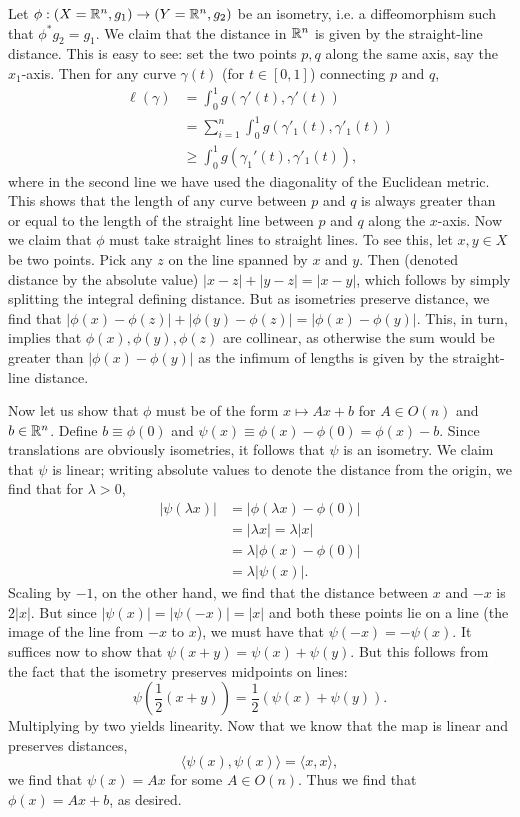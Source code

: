 \documentclass{../mathnotes}
\begin{document}
Let $\phi:(X=\mathbb{R}^n,g_1)\to(Y=\mathbb{R}^n,g_2)$ be an isometry, i.e. a diffeomorphism such that $\phi^*g_2=g_1$.
We claim that the distance in $\mathbb{R}^n$ is given by the straight-line distance. This is easy to see: set the two
points $p,q$ along the same axis, say the $x_1$-axis. Then for any curve $\gamma(t)$ (for $t\in[0,1]$) connecting
$p$ and $q$,
\begin{align*}
    \ell(\gamma) &= \int_0^1 g(\gamma'(t),\gamma'(t))\\
    &= \sum_{i=1}^n \int_0^1 g(\gamma'_1(t), \gamma'_1(t))\\
    &\geq \int_0^1 g(\gamma_1'(t),\gamma'_1(t)),
\end{align*}
where in the second line we have used the diagonality of the Euclidean metric. This shows that the length
of any curve between $p$ and $q$ is always greater than or equal to the length of the straight line between
$p$ and $q$ along the $x$-axis.
Now we claim that $\phi$ must take straight lines to straight lines. To see this, let $x,y\in X$ be two points.
Pick any $z$ on the line spanned by $x$ and $y$. Then (denoted distance by the absolute value) $|x-z|+|y-z|=|x-y|$,
which follows by simply splitting the integral defining distance. But as isometries preserve distance, we find
that $|\phi(x)-\phi(z)|+|\phi(y)-\phi(z)|=|\phi(x)-\phi(y)|$. This, in turn, implies that $\phi(x),\phi(y),\phi(z)$
are collinear, as otherwise the sum would be greater than $|\phi(x)-\phi(y)|$ as the infimum of lengths is given by the
straight-line distance.

Now let us show that $\phi$ must be of the form $x\mapsto Ax+b$ for $A\in O(n)$ and $b\in\mathbb{R}^n$.
Define $b\equiv\phi(0)$ and $\psi(x)\equiv \phi(x)-\phi(0)=\phi(x)-b$. Since translations are obviously
isometries, it follows that $\psi$ is an isometry. We claim that $\psi$ is linear; writing absolute values
to denote the distance from the origin, we find that for $\lambda>0$,
\begin{align*}
    |\psi(\lambda x)| &= |\phi(\lambda x)-\phi(0)|\\
    &= |\lambda x| = \lambda |x| \\
    &= \lambda |\phi(x)-\phi(0)|\\
    &= \lambda |\psi(x)|.
\end{align*}
Scaling by $-1$, on the other hand, we find that the distance between $x$ and $-x$ is $2|x|$. But since
$|\psi(x)|=|\psi(-x)|=|x|$ and both these points lie on a line (the image of the line from $-x$ to $x$),
we must have that $\psi(-x)=-\psi(x)$. It suffices now to show that $\psi(x+y)=\psi(x)+\psi(y)$.
But this follows from the fact that the isometry preserves midpoints on lines:
\[\psi\left( \frac{1}{2}(x+y) \right)=\frac{1}{2}\left(\psi(x)+\psi(y)\right).\]
Multiplying by two yields linearity. Now that we know that the map is linear and preserves distances,
\[\langle\psi(x),\psi(x)\rangle=\langle x,x\rangle,\]
we find that $\psi(x)=Ax$ for some $A\in O(n)$. Thus we find that $\phi(x)=Ax+b$, as desired.
\end{document}
